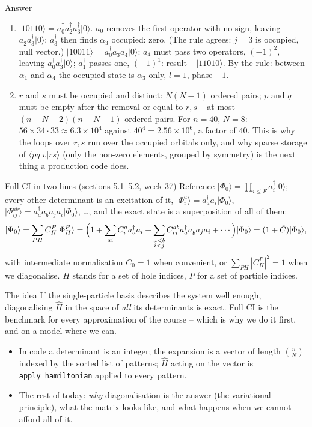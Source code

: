 \documentclass[aspectratio=169,10pt]{beamer}
\newcounter{thinkctr}
\newcommand{\thinka}[1]{%
  \begin{tcolorbox}[colback=paleteal,colframe=teal,title={\bfseries Answer to pause \#\thethinkctr}]
  #1
  \end{tcolorbox}}
\newcommand{\ket}[1]{\vert #1\rangle}
\newcommand{\element}[3]{\langle #1\vert #2\vert #3\rangle}
\begin{document}
\begin{frame}{Answer}
  \thinka{
  \begin{enumerate}
    \item $\ket{10110}=a_0^{\dagger}a_2^{\dagger}a_3^{\dagger}\ket{0}$. $a_0$ removes the first operator with no sign, leaving $a_2^{\dagger}a_3^{\dagger}\ket{0}$; $a_3^{\dagger}$ then finds $\alpha_3$ occupied: \alert{zero}. (The rule agrees: $j=3$ is occupied, null vector.) $\ket{10011}=a_0^{\dagger}a_3^{\dagger}a_4^{\dagger}\ket{0}$: $a_4$ must pass two operators, $(-1)^2$, leaving $a_0^{\dagger}a_3^{\dagger}\ket{0}$; $a_1^{\dagger}$ passes one, $(-1)^1$: result $-\ket{11010}$. By the rule: between $\alpha_1$ and $\alpha_4$ the occupied state is $\alpha_3$ only, $l=1$, phase $-1$. \checkmark
    \item $r$ and $s$ must be occupied and distinct: $N(N-1)$ ordered pairs; $p$ and $q$ must be empty after the removal or equal to $r,s$ -- at most $(n-N+2)(n-N+1)$ ordered pairs. For $n=40$, $N=8$: $56\times34\cdot33\approx6.3\times10^4$ against $40^4=2.56\times10^6$, a factor of $40$. This is why the loops over $r,s$ run over the occupied orbitals only, and why sparse storage of $\element{pq}{v}{rs}$ (only the non-zero elements, grouped by symmetry) is the next thing a production code does.
  \end{enumerate}}
\end{frame}

\begin{frame}{Full CI in two lines (sections 5.1--5.2, week 37)}
  \small
  Reference $\ket{\Phi_0}=\prod_{i\le F}a_i^{\dagger}\ket{0}$; every other determinant is an excitation of it, $\ket{\Phi_i^a}=a_a^{\dagger}a_i\ket{\Phi_0}$, $\ket{\Phi_{ij}^{ab}}=a_a^{\dagger}a_b^{\dagger}a_ja_i\ket{\Phi_0}$, \dots, and the exact state is a superposition of all of them:
  \[
    \ket{\Psi_0}=\sum_{PH}C_H^P\ket{\Phi_H^P}
    =\Bigl(1+\sum_{ai}C_i^aa_a^{\dagger}a_i+\sum_{\substack{a<b\\i<j}}C_{ij}^{ab}a_a^{\dagger}a_b^{\dagger}a_ja_i+\cdots\Bigr)\ket{\Phi_0}
    =(1+\hat{C})\ket{\Phi_0},
  \]
  with intermediate normalisation $C_0=1$ when convenient, or $\sum_{PH}|C_H^P|^2=1$ when we diagonalise. $H$ stands for a set of hole indices, $P$ for a set of particle indices.
  \begin{block}{The idea}
    If the single-particle basis describes the system well enough, diagonalising $\hat{H}$ in the space of \emph{all} its determinants is exact. Full CI is the benchmark for every approximation of the course -- which is why we do it first, and on a model where we can.
  \end{block}
  \begin{itemize}
    \item In code a determinant is an integer; the expansion is a vector of length $\binom{n}{N}$ indexed by the sorted list of patterns; $\hat{H}$ acting on the vector is \texttt{apply\_hamiltonian} applied to every pattern.
    \item The rest of today: \emph{why} diagonalisation is the answer (the variational principle), what the matrix looks like, and what happens when we cannot afford all of it.
  \end{itemize}
\end{frame}
\end{document}
